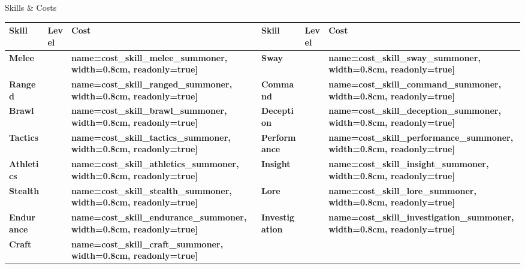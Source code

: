 \documentclass[10pt]{article}
\newcommand{\skilldots}[1]{%
  \TextField[
    name=#1,
    bordercolor={0 0 0},
    backgroundcolor={255 255 255},
    readonly=false,
    width=1.5cm,
    height=0.45cm,
    maxlen=1,
    chars=2,
    align=0,
    default=0
  ]{}%
  \hspace{-0.2em}%
  \raisebox{0.4ex}{%
    \small%
    \textcolor{gray}{%
      \(\bigcirc\)\(\bigcirc\)\(\bigcirc\)\(\bigcirc\)\(\bigcirc\)%
    }%
  }%
}
\newcommand{\tf}[1]{\TextField[#1]{}}
\begin{document}
\begin{Form}
\begin{minipage}[t]{0.48\linewidth}
    \begin{charbox}{Skills \& Costs}
        \begin{tabular}{>{\bfseries}p{2.5cm} >{\bfseries}p{1.5cm} >{\bfseries}p{1.5cm} >{\bfseries}p{2.5cm} >{\bfseries}p{1.5cm} >{\bfseries}p{1.5cm}}
            \toprule
            \textbf{Skill} & \textbf{Level} & \textbf{Cost} & \textbf{Skill} & \textbf{Level} & \textbf{Cost} \\
            \midrule
            Melee & \skilldots{skill_melee_summoner} & \tf[name=cost_skill_melee_summoner, width=0.8cm, readonly=true]{} & 
            Sway & \skilldots{skill_sway_summoner} & \tf[name=cost_skill_sway_summoner, width=0.8cm, readonly=true]{} \\
            Ranged & \skilldots{skill_ranged_summoner} & \tf[name=cost_skill_ranged_summoner, width=0.8cm, readonly=true]{} & 
            Command & \skilldots{skill_command_summoner} & \tf[name=cost_skill_command_summoner, width=0.8cm, readonly=true]{} \\
            Brawl & \skilldots{skill_brawl_summoner} & \tf[name=cost_skill_brawl_summoner, width=0.8cm, readonly=true]{} & 
            Deception & \skilldots{skill_deception_summoner} & \tf[name=cost_skill_deception_summoner, width=0.8cm, readonly=true]{} \\
            Tactics & \skilldots{skill_tactics_summoner} & \tf[name=cost_skill_tactics_summoner, width=0.8cm, readonly=true]{} & 
            Performance & \skilldots{skill_performance_summoner} & \tf[name=cost_skill_performance_summoner, width=0.8cm, readonly=true]{} \\
            Athletics & \skilldots{skill_athletics_summoner} & \tf[name=cost_skill_athletics_summoner, width=0.8cm, readonly=true]{} & 
            Insight & \skilldots{skill_insight_summoner} & \tf[name=cost_skill_insight_summoner, width=0.8cm, readonly=true]{} \\
            Stealth & \skilldots{skill_stealth_summoner} & \tf[name=cost_skill_stealth_summoner, width=0.8cm, readonly=true]{} & 
            Lore & \skilldots{skill_lore_summoner} & \tf[name=cost_skill_lore_summoner, width=0.8cm, readonly=true]{} \\
            Endurance & \skilldots{skill_endurance_summoner} & \tf[name=cost_skill_endurance_summoner, width=0.8cm, readonly=true]{} & 
            Investigation & \skilldots{skill_investigation_summoner} & \tf[name=cost_skill_investigation_summoner, width=0.8cm, readonly=true]{} \\
            Craft & \skilldots{skill_craft_summoner} & \tf[name=cost_skill_craft_summoner, width=0.8cm, readonly=true]{} & 

\end{tabular}
\end{charbox}
\end{minipage}
\end{Form}
\end{document}
